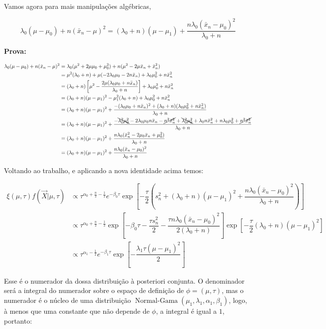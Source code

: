\documentclass[a4paper]{article}
\newcommand{\op}[1]{{\operatorname{#1}}}
\newcommand{\vX}{\vec X}
\newcommand{\xn}{\bar{x}_n}
\newcommand{\sn}{s^2_n}
\begin{document}
Vamos agora para mais manipulações algébricas,
\begin{identity}
	\[\lambda_0(\mu-\mu_0)+n(\xn-\mu)^2=(\lambda_0+n)(\mu-\mu_1)+\dfrac{n\lambda_0(\xn-\mu_0)^2}{\lambda_0+n}\]
\end{identity}

\textbf{Prova:}

\begin{align*}
	\lambda_0(\mu-\mu_0)+n(\xn-\mu)^2&=\lambda_0(\mu^2+2\mu\mu_0+\mu_0^2)+n(\mu^2-2\mu\xn+\xn^2)\\
	&=\mu^2(\lambda_0+n)+\mu(-2\lambda_0\mu_0-2n\xn)+\lambda_0\mu_0^2+n\xn^2\\
	&=(\lambda_0+n)\left[\mu^2-\dfrac{2\mu(\lambda_0\mu_0+n\xn)}{\lambda_0+n}\right]+\lambda_0\mu_0^2+n\xn^2\\
	&=(\lambda_0+n)(\mu-\mu_1)^2-\mu_1^2(\lambda_0+n)+\lambda_0\mu_0^2+n\xn^2\\
	&=(\lambda_0+n)(\mu-\mu_1)^2+\dfrac{-(\lambda_0\mu_0+n\xn)^2+(\lambda_0+n)(\lambda_0\mu_0^2+n\xn^2)}{\lambda_0+n}\\
	&=(\lambda_0+n)(\mu-\mu_1)^2+\dfrac{-\bcancel{\lambda_0^2\mu_0^2}-2\lambda_0\mu_0n\xn-\cancel{n^2\xn^2}+\bcancel{\lambda_0^2\mu_0^2}+\lambda_0n\xn^2+n\lambda_0\mu_0^2+\cancel{n^2\xn^2}}{\lambda_0+n}\\
	&=(\lambda_0+n)(\mu-\mu_1)^2+\dfrac{n\lambda_0(\xn^2-2\mu_0\xn+\mu_0^2)}{\lambda_0+n}\\
	&=(\lambda_0+n)(\mu-\mu_1)^2+\dfrac{n\lambda_0(\xn-\mu_0)^2}{\lambda_0+n}
\end{align*}

Voltando ao trabalho, e aplicando a nova identidade acima temos:

\begin{align*}
\xi(\mu,\tau)f(\vX|\mu,\tau)&\propto \tau^{\alpha_0+\frac n 2-\frac12}e^{-\beta_0\tau}\exp{\left[-\dfrac{\tau}{2}\left(\sn+(\lambda_0+n)(\mu-\mu_1)^2+\dfrac{n\lambda_0(\xn-\mu_0)^2}{\lambda_0+n}\right)\right]}\\
&\propto \tau^{\alpha_0+\frac n 2-\frac12}\exp{\left[-\beta_0\tau-\dfrac{\tau\sn}{2}-\dfrac{\tau n\lambda_0(\xn-\mu_0)^2}{2(\lambda_0+n)}\right]}\exp{\left[-\dfrac{\tau}{2}(\lambda_0+n)(\mu-\mu_1)^2\right]}\\
&\propto\tau^{\alpha_1-\frac12}e^{-\beta_1\tau}\exp{\left[-\dfrac{\lambda_1\tau(\mu-\mu_1)^2}{2}\right]}
\end{align*}

Esse é o numerador da dossa distribuição à posteriori conjunta. O denominador será a integral do numerador sobre o espaço de definição de $\phi=(\mu,\tau)$, mas o numerador é o núcleo de uma distribuição $\op{Normal-Gama}(\mu_1,\lambda_1,\alpha_1,\beta_1)$, logo, à menos que uma constante que não depende de $\phi$, a integral é igual a $1$, portanto:
\end{document}
